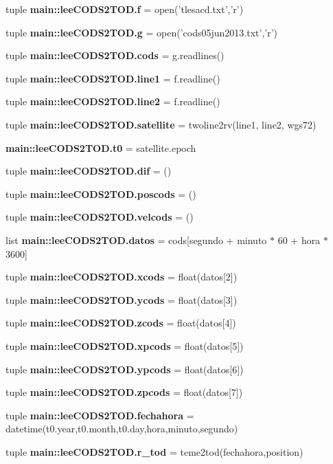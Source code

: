 \begin{DoxyCompactItemize}
\item 
tuple {\bf main\-::lee\-C\-O\-D\-S2\-T\-O\-D.\-f} = open('tlesacd.\-txt','r')
\item 
tuple {\bf main\-::lee\-C\-O\-D\-S2\-T\-O\-D.\-g} = open('cods05jun2013.\-txt','r')
\item 
tuple {\bf main\-::lee\-C\-O\-D\-S2\-T\-O\-D.\-cods} = g.\-readlines()
\item 
tuple {\bf main\-::lee\-C\-O\-D\-S2\-T\-O\-D.\-line1} = f.\-readline()
\item 
tuple {\bf main\-::lee\-C\-O\-D\-S2\-T\-O\-D.\-line2} = f.\-readline()
\item 
tuple {\bf main\-::lee\-C\-O\-D\-S2\-T\-O\-D.\-satellite} = twoline2rv(line1, line2, wgs72)
\item 
{\bf main\-::lee\-C\-O\-D\-S2\-T\-O\-D.\-t0} = satellite.\-epoch
\item 
tuple {\bf main\-::lee\-C\-O\-D\-S2\-T\-O\-D.\-dif} = ()
\item 
tuple {\bf main\-::lee\-C\-O\-D\-S2\-T\-O\-D.\-poscods} = ()
\item 
tuple {\bf main\-::lee\-C\-O\-D\-S2\-T\-O\-D.\-velcods} = ()
\item 
list {\bf main\-::lee\-C\-O\-D\-S2\-T\-O\-D.\-datos} = cods[segundo + minuto $\ast$ 60 + hora $\ast$ 3600]
\item 
tuple {\bf main\-::lee\-C\-O\-D\-S2\-T\-O\-D.\-xcods} = float(datos[2])
\item 
tuple {\bf main\-::lee\-C\-O\-D\-S2\-T\-O\-D.\-ycods} = float(datos[3])
\item 
tuple {\bf main\-::lee\-C\-O\-D\-S2\-T\-O\-D.\-zcods} = float(datos[4])
\item 
tuple {\bf main\-::lee\-C\-O\-D\-S2\-T\-O\-D.\-xpcods} = float(datos[5])
\item 
tuple {\bf main\-::lee\-C\-O\-D\-S2\-T\-O\-D.\-ypcods} = float(datos[6])
\item 
tuple {\bf main\-::lee\-C\-O\-D\-S2\-T\-O\-D.\-zpcods} = float(datos[7])
\item 
tuple {\bf main\-::lee\-C\-O\-D\-S2\-T\-O\-D.\-fechahora} = datetime(t0.\-year,t0.\-month,t0.\-day,hora,minuto,segundo)
\item 
tuple {\bf main\-::lee\-C\-O\-D\-S2\-T\-O\-D.\-r\-\_\-tod} = teme2tod(fechahora,position)
\end{DoxyCompactItemize}
